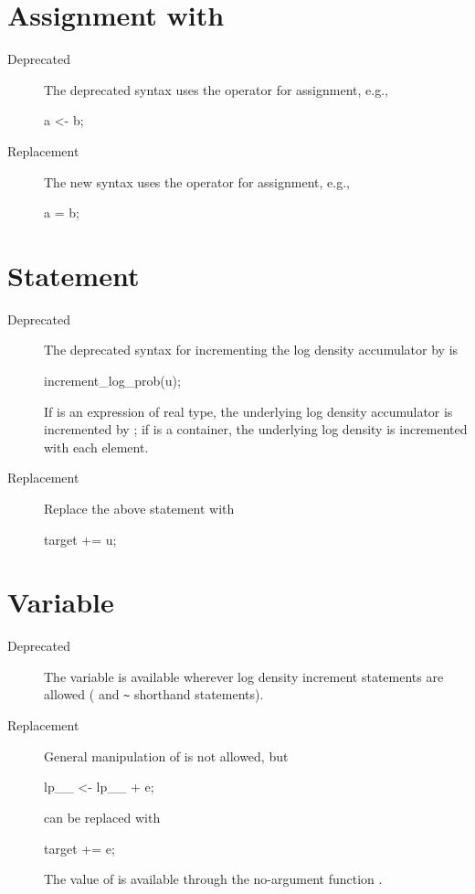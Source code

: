 \section{Assignment with \code{<-}}

\begin{description}
\item[Deprecated] The deprecated syntax uses the operator \code{<-}
  for assignment, e.g.,
\begin{stancode}
a <- b;
\end{stancode}
\item[Replacement] The new syntax uses the operator \code{=} for
  assignment, e.g.,
\begin{stancode}
a = b;
\end{stancode}
\end{description}

\section{ Statement}

\begin{description}
\item[Deprecated] The deprecated syntax for incrementing the log
  density accumulator by  is
\begin{stancode}
increment_log_prob(u);
\end{stancode}
If  is an expression of real type, the underlying log density
accumulator is incremented by ;  if  is a container,
the underlying log density is incremented with each element.
\item[Replacement] Replace the above statement with
\begin{stancode}
target += u;
\end{stancode}
\end{description}

\section{ Variable}

\begin{description}
\item[Deprecated]
The variable  is available wherever log density increment
statements are allowed ( and \Verb|~| shorthand
statements).
\item[Replacement]
General manipulation of  is not allowed, but
\begin{stancode}
lp__ <- lp__ + e;
\end{stancode}
%
can be replaced with
%
\begin{stancode}
target += e;
\end{stancode}
%
The value of  is available through the no-argument
function .
\end{description}

